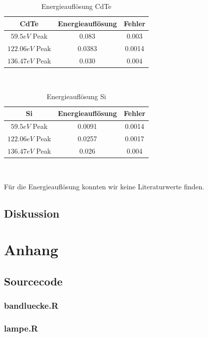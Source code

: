\documentclass[12pt]{article}
\begin{document}
\begin{table}[h!]
{\centering{}
\begin{tabular}{c||c|c}
	CdTe				& Energieauflösung & Fehler	\\ \hline\hline
$59.5 eV$ Peak		& 0.083		        & 0.003		\\ \hline
$122.06 eV$ Peak	& 0.0383		    & 0.0014	\\ \hline
$136.47 eV$ Peak	& 0.030	         	& 0.004
\end{tabular}\\ }
 \caption{Energieauflösung CdTe}
\end{table}

\begin{table}[h!]

{\centering{}
\begin{tabular}{c||c|c}
	Si				& Energieauflösung & Fehler	\\ \hline\hline
$59.5 eV$ Peak		& 0.0091		    & 0.0014 	\\ \hline
$122.06 eV$ Peak	& 0.0257			& 0.0017	\\ \hline
$136.47 eV$ Peak	& 0.026		     	& 0.004
\end{tabular}\\}
 \caption{Energieauflösung Si}
\end{table}

Für die Energieauflösung konnten wir keine Literaturwerte finden.



\subsection{Diskussion}\label{Diskussion}


\newpage
\section{Anhang}

\subsection{Sourcecode}
\subsubsection{bandluecke.R}\label{srcbandluecke}

\subsubsection{lampe.R}\label{srclampe}

\end{document}
